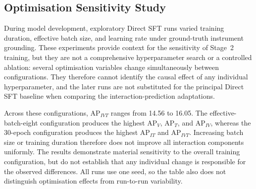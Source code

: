 
\subsection{Optimisation Sensitivity Study}
\label{sec:c5:appendix-optimisation}

During model development, exploratory Direct SFT runs varied training duration, effective batch size, and learning rate under ground-truth instrument grounding. These experiments provide context for the sensitivity of Stage~2 training, but they are not a comprehensive hyperparameter search or a controlled ablation: several optimisation variables change simultaneously between configurations. They therefore cannot identify the causal effect of any individual hyperparameter, and the later runs are not substituted for the principal Direct SFT baseline when comparing the interaction-prediction adaptations.

\begin{table}[htb!]
\centering
\caption{Influence of optimisation settings on Direct SFT under ground-truth instrument grounding. All configurations use the same model architecture, but several optimisation variables change simultaneously. Bold values indicate the highest observed score in each column.}
\label{tab:c5:optimisation-sensitivity}
\end{table}

Across these configurations, AP$_{IVT}$ ranges from 14.56 to 16.05. The effective-batch-eight configuration produces the highest AP$_V$, AP$_T$, and AP$_{IV}$, whereas the 30-epoch configuration produces the highest AP$_{IT}$ and AP$_{IVT}$. Increasing batch size or training duration therefore does not improve all interaction components uniformly. The results demonstrate material sensitivity to the overall training configuration, but do not establish that any individual change is responsible for the observed differences. All runs use one seed, so the table also does not distinguish optimisation effects from run-to-run variability.
